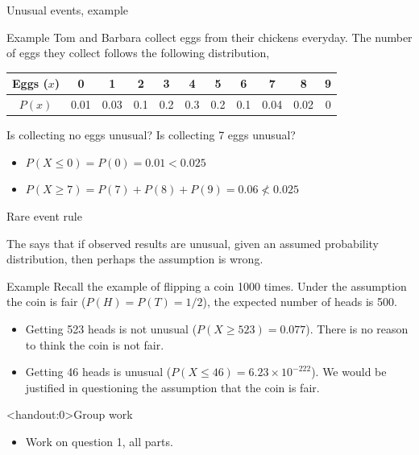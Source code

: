 \documentclass[xcolor=table, handout]{beamer}
\begin{document}
\begin{frame}{Unusual events, example}
\begin{exampleblock}{Example}
Tom and Barbara collect eggs from their chickens everyday. The number of eggs they collect follows the following distribution,\\
\smallskip
{\centering
\begin{tabular}{c|cccccccccc}
Eggs ($x$) & 0 & 1 & 2 & 3 & 4 & 5 & 6 & 7 & 8 & 9 \\
\hline
$P(x)$ & 0.01 & 0.03 & 0.1 & 0.2 & 0.3 & 0.2 & 0.1 & 0.04 & 0.02 & 0
\end{tabular}\par
}
\medskip
Is collecting no eggs unusual? Is collecting 7 eggs unusual?
\begin{itemize}
\pause\item $P(X\le 0) = P(0)  = 0.01  < 0.025$
\pause\item $P(X \ge 7) = P(7) + P(8) + P(9) = 0.06 \not < 0.025$
\end{itemize}
\end{exampleblock}
\end{frame}

\begin{frame}{Rare event rule}
\begin{block}{}
The  says that if observed results are unusual, given an assumed probability distribution, then perhaps the assumption is wrong.
\end{block}
\pause
\begin{exampleblock}{Example}
Recall the example of flipping a coin 1000 times. Under the assumption the coin is fair ($P(H) = P(T) = 1/2$), the expected number of heads is 500.
\begin{itemize}
\pause\item Getting 523 heads is not unusual ($P(X \ge 523) = 0.077$). There is no reason to think the coin is not fair.
\pause\item Getting 46 heads is unusual ($P(X \le 46) = 6.23 \times 10^{-222}$). We would be justified in questioning the assumption that the coin is fair.
\end{itemize}
\end{exampleblock}
\end{frame}

\begin{frame}<handout:0>{Group work}
\begin{block}{}
\large
\begin{itemize}
\item Work on question 1, all parts.
\end{itemize}
\end{block}
\end{frame}
\end{document}
